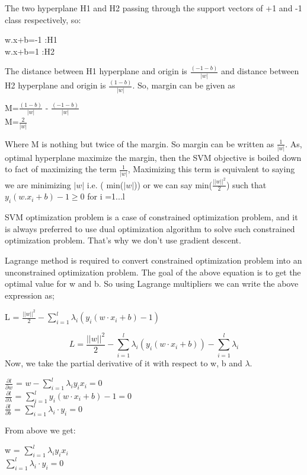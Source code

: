 \documentclass[hidelinks,12pt]{article}
\begin{document}
	The two hyperplane H1 and H2 passing through the support vectors of +1 and -1 class respectively, so:
	\begin{center}
	w.x+b=-1 :H1\\
	w.x+b=1 :H2    
	\end{center}
	The distance between H1 hyperplane and origin is $\frac{(-1-b)}{|w|}$ and distance between H2 hyperplane and origin is $\frac{(1-b)}{|w|}$. So, margin can be given as
	\begin{center}
	M=$\frac{(1-b)}{|w|}$ - $\frac{(-1-b)}{|w|}$\\
	M=$\frac{2}{|w|}$
	\end{center}
	Where M is nothing but twice of the margin. So margin can be written as $\frac{1}{|w|}$. As, optimal hyperplane maximize the margin, then the SVM objective is boiled down to fact of maximizing the term $\frac{1}{|w|}$,
	Maximizing this term is equivalent to saying we are minimizing $|w|$ i.e. ( min($|w|$))
	or we can say min($\frac{||w||^2}{2}$) such that $y_i(w.x_i + b)-1 \geq 0$ for i =1...l

	SVM optimization problem is a case of constrained optimization problem, and it is always preferred to use dual optimization algorithm to solve such constrained optimization problem. That’s why we don’t use gradient descent.

	Lagrange method is required to convert constrained optimization problem into an unconstrained optimization problem. The goal of the above equation is to get the optimal value for w and b. So using Lagrange multipliers we can write the above expression as;
	\begin{center}
	    L = $\frac{||w||^2}{2} - \sum_{i=1}^{l} \lambda_i(y_i(w\cdot x_i+b)-1)$\\
	\end{center}
	\begin{equation}
	            L = \frac{||w||^2}{2} - \sum_{i=1}^{l} \lambda_i(y_i(w\cdot x_i+b))-\sum_{i=1}^{l}\lambda_i
	\end{equation}
	Now, we take the partial derivative of it with respect to w, b and $\lambda$.
	\begin{center}
	        $\frac{\partial l}{\partial w}$ = $w - \sum_{i=1}^{l} \lambda_i y_i x_i=0$\\
	        $\frac{\partial l}{\partial \lambda}$ = $ \sum_{i=1}^{l} y_i (w \cdot x_i+b)-1=0$\\
	        $\frac{\partial l}{\partial b}$ = $ \sum_{i=1}^{l} \lambda_i \cdot y_i=0$
	\end{center}
	From above we get:
	\begin{center}
	        w = $\sum_{i=1}^{l} \lambda_i y_i x_i$\\
	        $ \sum_{i=1}^{l} \lambda_i \cdot y_i=0$
	\end{center}
\end{document}
